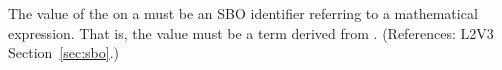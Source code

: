 The value of the   on a \Trigger must be an SBO
identifier referring to a mathematical expression.  That is, the value
must be a term derived from \sbomathformula.  (References: 
L2V3 Section~\ref{sec:sbo}.)
